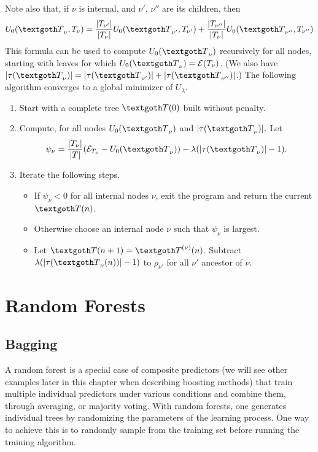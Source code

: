 Note also that, if $\nu$ is internal,  and $\nu'$, $\nu''$ are its children, then
\[
U_0(\CTR_\nu, T_\nu) = \frac{|T_{\nu'}|}{|T_\nu|} U_0(\CTR_{\nu'}, T_{\nu'}) + \frac{|T_{\nu''}|}{|T_\nu|} U_0(\CTR_{\nu''}, T_{\nu''})
\]
This formula can be used to compute $U_0(\CTR_\nu) $ recursively for all nodes,  starting with leaves for which  $U_0(\CTR_\nu)  = \CE(T_\nu)$. (We also have $|\tau(\CTR_\nu)| = |\tau(\CTR_{\nu'})| + |\tau(\CTR_{\nu''})|$.)  The following algorithm converges  to a \alert{global minimizer} of $U_\lambda$. 

\begin{algorithm}[Pruning]
\label{alg:pruning} 
\begin{enumerate}
\item Start with a complete tree $\CTR(0)$ built without penalty. 
\item Compute, for all nodes $U_0(\CTR_\nu)$ and $|\tau(\CTR_\nu)|$. Let 
\[
\psi_\nu = \frac{|T_\nu|}{|T|} (\CE_{T_\nu} - U_0(\CTR_\nu))  - \lambda (|\tau(\CTR_\nu)|-1).
\]
\item Iterate the following steps.
\begin{itemize}
\item If $\psi_\nu <0$ for all internal nodes $\nu$, exit the program and return the current $\CTR(n)$.
\item Otherwise choose an internal node $\nu$ such that $\psi_\nu$ is largest. 
\item Let $\CTR(n+1) = \CTR^{(\nu)}(n)$.  Subtract $ \lambda (|\tau(\CTR_\nu(n))|-1)$ to  $\rho_{\nu'}$ for all $\nu'$ ancestor of $\nu$.
\end{itemize}
\end{enumerate}
\end{algorithm}

 \section{Random Forests}
 \subsection{Bagging}
A random forest \cite{amit1997shape,breiman2001random} is a special case of composite predictors (we will see other examples later in this chapter when describing boosting methods) that train multiple individual predictors under various conditions and combine them, through averaging, or majority voting.  
  With random forests, one generates individual trees by randomizing the parameters of the learning
process. One way to achieve this is to randomly  sample from the training set before running the training algorithm.

